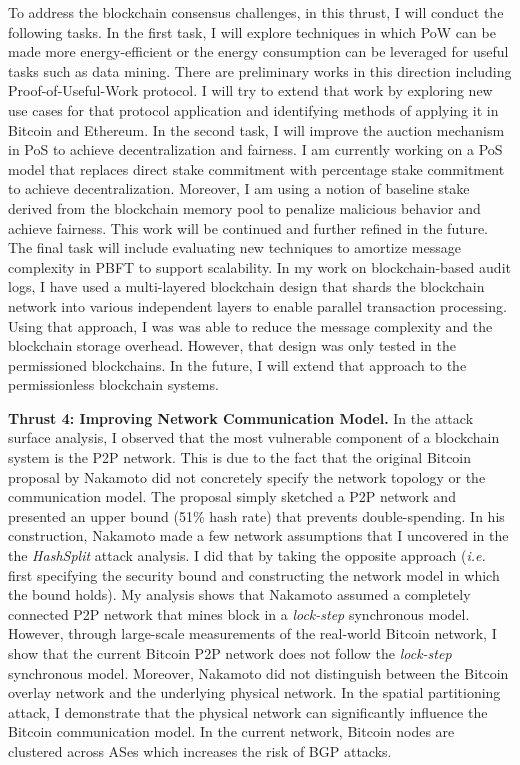 \documentclass{NSF}
\newcommand{\BfPara}[1]{{\noindent\textbf{#1.}}\xspace}
\newcommand{\ie}{{\em i.e.}\xspace}
\begin{document}
To address the blockchain consensus challenges, in this thrust, I will conduct the following tasks. In the first task, I will explore techniques in which PoW can be made more energy-efficient or the energy consumption can be leveraged for useful tasks such as data mining. There are preliminary works in this direction including Proof-of-Useful-Work protocol. I will try to extend that work by exploring new use cases for that protocol application and identifying methods of applying it in Bitcoin and Ethereum. In the second task, I will improve the auction mechanism in PoS to achieve decentralization and fairness. I am currently working on a PoS model that replaces direct stake commitment with percentage stake commitment to achieve decentralization. Moreover, I am using a notion of baseline stake derived from the blockchain memory pool to penalize malicious behavior and achieve fairness. This work will be continued and further refined in the future. The final task will include evaluating new techniques to amortize message complexity in PBFT to support scalability. In my work on blockchain-based audit logs, I have used a multi-layered blockchain design that shards the blockchain network into various independent layers to enable parallel transaction processing. Using that approach, I was was able to reduce the message complexity and the blockchain storage overhead. However, that design was only tested in the permissioned blockchains. In the future, I will extend that approach to the permissionless blockchain systems. 


\vspace{2mm}


\BfPara{Thrust 4: Improving Network Communication Model} In the attack surface analysis, I observed that the most vulnerable component of a blockchain system is the P2P network. This is due to the fact that the original Bitcoin proposal by Nakamoto did not concretely specify the network topology or the communication model. The proposal simply sketched a P2P network and presented an upper bound (51\% hash rate) that prevents double-spending. In his construction, Nakamoto made a few network assumptions that I uncovered in the the {\em HashSplit} attack analysis. I did that by taking the opposite approach (\ie first specifying the security bound and constructing the network model in which the bound holds). My analysis shows that Nakamoto assumed a completely connected P2P network that mines block in a {\em lock-step} synchronous model. However, through large-scale measurements of the real-world Bitcoin network, I show that the current Bitcoin P2P network does not follow the {\em lock-step} synchronous model. Moreover, Nakamoto did not distinguish between the Bitcoin overlay network and the underlying physical network. In the spatial partitioning attack, I demonstrate that the physical network can significantly influence the Bitcoin communication model. In the current network, Bitcoin nodes are clustered across ASes which increases the risk of BGP attacks.
\end{document}
